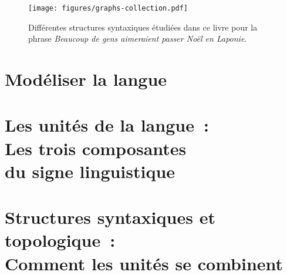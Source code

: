 \documentclass
  [output=book,
   booklanguage=french, 
   multiauthors,
   tblseight,
  ]{langscibook}
\begin{document}
{\begin{otherlanguage}{english}
\maketitle
\end{otherlanguage}
}
\frontmatter\cleardoublepage
     \thispagestyle{empty}
     \begin{figure}[p]
     \captionsetup{labelformat=empty}
     \caption{Différentes structures syntaxiques étudiées dans ce livre pour la phrase \textit{Beaucoup de gens aimeraient passer Noël en Laponie}.}
     \texttt{[image: figures/graphs-collection.pdf]}
     \end{figure}\clearpage
\tableofcontents
\newpage{}
\mainmatter



% 
\part{Modéliser la langue}





\part[Les unités de la langue~: Les trois composantes du signe linguistique]
     {Les unités de la langue~:\\Les trois composantes\\du signe linguistique}\label{sec:2}





\part[Structures syntaxiques et topologique~: Comment les unités se combinent]
     {Structures syntaxiques et topologique~:\\Comment les unités se combinent}\label{sec:3}









% 

\end{document}
